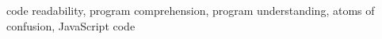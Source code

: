 \documentclass[10pt,conference,blind]{IEEEtran}
\begin{document}
\begin{abstract}
\end{abstract}

\begin{IEEEkeywords}
code readability, program comprehension, program understanding, atoms of confusion, JavaScript code
\end{IEEEkeywords}








% 





\vspace{12pt}
\end{document}
